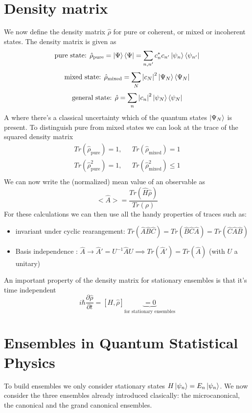 \documentclass{report}
\begin{document}
\section{Density matrix}
We now define the density matrix $\hat{\rho}$ for pure or coherent, or mixed or incoherent states. The density matrix is given as \[
\text{pure state: } \hat{\rho}_{\text{pure}} = \ket{\Psi}\bra{\Psi} = \sum_{n,n'} c_{n}^* c_{n'} \ket{\psi_n}\bra{\psi_{n'}} 
\] \[
\text{mixed state: } \hat{\rho}_\text{mixed} = \sum_{N} \abs{c_N}^2 \ket{\Psi_N} \bra{\Psi_N} 
\] \[
\text{general state: } \hat{\rho} = \sum_{n} \abs{c_n}^2 \ket{\psi_N} \bra{\psi_N} 
\] 
A where there's a classical uncertainty which of the quantum states $\ket{\Psi_N}$ is present. To distinguish pure from mixed states we can look at the trace of the squared density matrix
\begin{align*}
  Tr\left( \hat{\rho}_\text{pure} \right) = 1, \text{  } & Tr\left( \hat{\rho}_\text{mixed} \right) = 1 \\
  Tr\left( \hat{\rho}_\text{pure}^2\right) = 1, \text{  } & Tr\left( \hat{\rho}_\text{mixed}^2 \right) \le  1 \\
\end{align*}
We can now write the (normalized) mean value of an observable as \[
  <\hat{A}> = \frac{Tr\left( \hat{H} \hat{\rho} \right) }{Tr\left( \rho \right) }
\] 
For these calculations we can then use all the handy properties of traces such as:
\begin{itemize}
  \item invariant under cyclic rearangement: $Tr\left( \hat{A} \hat{B} \hat{C} \right) = Tr\left( \hat{B} \hat{C} \hat{A} \right) = Tr\left( \hat{C} \hat{A} \hat{B} \right) $ 
  \item Basis independence : $\hat{A} \to \hat{A}' = U^{-1} \hat{A} U \implies Tr\left( \hat{A}' \right) = Tr\left( \hat{A} \right) $ (with $U$ a unitary)
\end{itemize}
An important property of the density matrix for stationary ensembles is that it's time independent \[
  i\hbar \frac{\partial \hat{\rho} }{\partial t} = [H, \hat{\rho}] \underbrace{= 0}_{\text{for stationary ensembles}}
\] 
\section{Ensembles in Quantum Statistical Physics}
To build ensembles we only consider stationary states $H \ket{\psi_n} = E_n \ket{\psi_n}$. We now consider the three ensembles already introduced clasically: the microcanonical, the canonical and the grand canonical ensembles.
\end{document}
